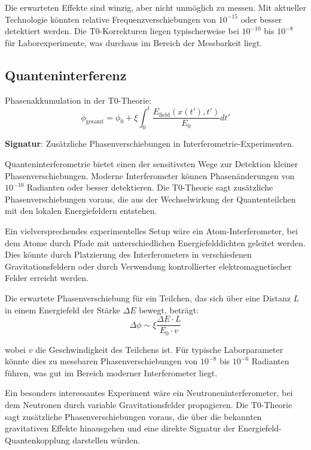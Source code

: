 \documentclass[12pt,a4paper]{article}
\newcommand{\xipar}{\xi}
\theoremstyle{definition}
\theoremstyle{remark}
\begin{document}
Die erwarteten Effekte sind winzig, aber nicht unmöglich zu messen. Mit aktueller Technologie könnten relative Frequenzverschiebungen von $10^{-15}$ oder besser detektiert werden. Die T0-Korrekturen liegen typischerweise bei $10^{-10}$ bis $10^{-8}$ für Laborexperimente, was durchaus im Bereich der Messbarkeit liegt.

\subsection{Quanteninterferenz}

Phasenakkumulation in der T0-Theorie:
\begin{equation}
	\phi_{\text{gesamt}} = \phi_0 + \xipar \int_0^t \frac{E_{\text{field}}(x(t'), t')}{E_0} dt'
	\label{eq:phase_accumulation}
\end{equation}

\textbf{Signatur}: Zusätzliche Phasenverschiebungen in Interferometrie-Experimenten.

Quanteninterferometrie bietet einen der sensitivsten Wege zur Detektion kleiner Phasenverschiebungen. Moderne Interferometer können Phasenänderungen von $10^{-10}$ Radianten oder besser detektieren. Die T0-Theorie sagt zusätzliche Phasenverschiebungen voraus, die aus der Wechselwirkung der Quantenteilchen mit den lokalen Energiefeldern entstehen.

Ein vielversprechendes experimentelles Setup wäre ein Atom-Interferometer, bei dem Atome durch Pfade mit unterschiedlichen Energiefelddichten geleitet werden. Dies könnte durch Platzierung des Interferometers in verschiedenen Gravitationsfeldern oder durch Verwendung kontrollierter elektromagnetischer Felder erreicht werden.

Die erwartete Phasenverschiebung für ein Teilchen, das sich über eine Distanz $L$ in einem Energiefeld der Stärke $\Delta E$ bewegt, beträgt:
$$\Delta \phi \sim \xipar \frac{\Delta E \cdot L}{E_0 \cdot v}$$

wobei $v$ die Geschwindigkeit des Teilchens ist. Für typische Laborparameter könnte dies zu messbaren Phasenverschiebungen von $10^{-8}$ bis $10^{-6}$ Radianten führen, was gut im Bereich moderner Interferometer liegt.

Ein besonders interessantes Experiment wäre ein Neutroneninterferometer, bei dem Neutronen durch variable Gravitationsfelder propagieren. Die T0-Theorie sagt zusätzliche Phasenverschiebungen voraus, die über die bekannten gravitativen Effekte hinausgehen und eine direkte Signatur der Energiefeld-Quantenkopplung darstellen würden.
\end{document}

